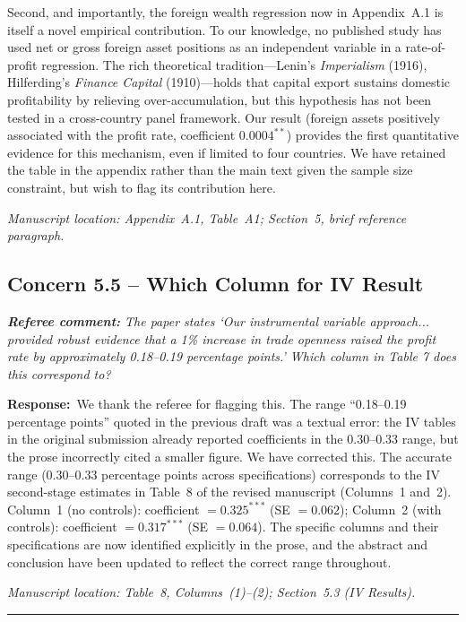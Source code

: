 \documentclass[11pt]{article}
\newcommand{\RC}[1]{\begin{refereebox}\textit{\textbf{Referee comment:} #1}\end{refereebox}}
\newcommand{\AR}{\noindent\textbf{Response:}\ }
\begin{document}
Second, and importantly, the foreign wealth regression now in Appendix~A.1 is itself a novel empirical contribution. To our knowledge, no published study has used net or gross foreign asset positions as an independent variable in a rate-of-profit regression. The rich theoretical tradition---Lenin's \textit{Imperialism} (1916), Hilferding's \textit{Finance Capital} (1910)---holds that capital export sustains domestic profitability by relieving over-accumulation, but this hypothesis has not been tested in a cross-country panel framework. Our result (foreign assets positively associated with the profit rate, coefficient $0.0004^{**}$) provides the first quantitative evidence for this mechanism, even if limited to four countries. We have retained the table in the appendix rather than the main text given the sample size constraint, but wish to flag its contribution here.

\smallskip\noindent\textit{Manuscript location: Appendix~A.1, Table~A1; Section~5, brief reference paragraph.}

\subsection*{Concern 5.5 -- Which Column for IV Result}

\RC{The paper states `Our instrumental variable approach... provided robust evidence that a 1\% increase in trade openness raised the profit rate by approximately 0.18--0.19 percentage points.' Which column in Table 7 does this correspond to?}

\AR We thank the referee for flagging this. The range ``0.18--0.19 percentage points'' quoted in the previous draft was a textual error: the IV tables in the original submission already reported coefficients in the 0.30--0.33 range, but the prose incorrectly cited a smaller figure. We have corrected this. The accurate range (0.30--0.33 percentage points across specifications) corresponds to the IV second-stage estimates in Table~8 of the revised manuscript (Columns~1 and~2). Column~1 (no controls): coefficient $= 0.325^{***}$ (SE $= 0.062$); Column~2 (with controls): coefficient $= 0.317^{***}$ (SE $= 0.064$). The specific columns and their specifications are now identified explicitly in the prose, and the abstract and conclusion have been updated to reflect the correct range throughout.

\smallskip\noindent\textit{Manuscript location: Table~8, Columns~(1)--(2); Section~5.3 (IV Results).}

\bigskip\noindent\rule{\textwidth}{0.4pt}\bigskip
\end{document}
